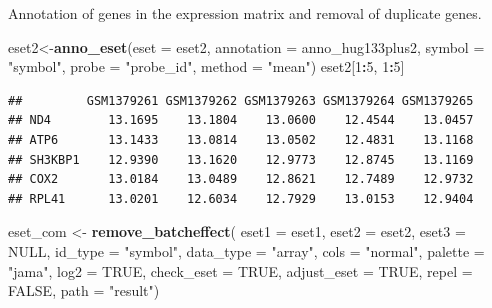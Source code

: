 \documentclass[
  12pt,
]{book}
\newenvironment{Shaded}{\begin{snugshade}}{\end{snugshade}}
\newcommand{\AttributeTok}[1]{\textcolor[rgb]{0.13,0.29,0.53}{#1}}
\newcommand{\ConstantTok}[1]{\textcolor[rgb]{0.56,0.35,0.01}{#1}}
\newcommand{\DecValTok}[1]{\textcolor[rgb]{0.00,0.00,0.81}{#1}}
\newcommand{\FunctionTok}[1]{\textcolor[rgb]{0.13,0.29,0.53}{\textbf{#1}}}
\newcommand{\NormalTok}[1]{#1}
\newcommand{\OtherTok}[1]{\textcolor[rgb]{0.56,0.35,0.01}{#1}}
\newcommand{\SpecialCharTok}[1]{\textcolor[rgb]{0.81,0.36,0.00}{\textbf{#1}}}
\newcommand{\StringTok}[1]{\textcolor[rgb]{0.31,0.60,0.02}{#1}}
\begin{document}
Annotation of genes in the expression matrix and removal of duplicate genes.

\begin{Shaded}
\begin{Highlighting}[]
\NormalTok{eset2}\OtherTok{\textless{}{-}}\FunctionTok{anno\_eset}\NormalTok{(}\AttributeTok{eset       =}\NormalTok{ eset2,}
                 \AttributeTok{annotation =}\NormalTok{ anno\_hug133plus2,}
                 \AttributeTok{symbol     =} \StringTok{"symbol"}\NormalTok{,}
                 \AttributeTok{probe      =} \StringTok{"probe\_id"}\NormalTok{,}
                 \AttributeTok{method     =} \StringTok{"mean"}\NormalTok{)}
\NormalTok{eset2[}\DecValTok{1}\SpecialCharTok{:}\DecValTok{5}\NormalTok{, }\DecValTok{1}\SpecialCharTok{:}\DecValTok{5}\NormalTok{]}
\end{Highlighting}
\end{Shaded}

\begin{verbatim}
##         GSM1379261 GSM1379262 GSM1379263 GSM1379264 GSM1379265
## ND4        13.1695    13.1804    13.0600    12.4544    13.0457
## ATP6       13.1433    13.0814    13.0502    12.4831    13.1168
## SH3KBP1    12.9390    13.1620    12.9773    12.8745    13.1169
## COX2       13.0184    13.0489    12.8621    12.7489    12.9732
## RPL41      13.0201    12.6034    12.7929    13.0153    12.9404
\end{verbatim}

\begin{Shaded}
\begin{Highlighting}[]
\NormalTok{eset\_com }\OtherTok{\textless{}{-}} \FunctionTok{remove\_batcheffect}\NormalTok{( }\AttributeTok{eset1       =}\NormalTok{ eset1,  }
                                \AttributeTok{eset2       =}\NormalTok{ eset2,   }
                                \AttributeTok{eset3       =} \ConstantTok{NULL}\NormalTok{,}
                                \AttributeTok{id\_type     =} \StringTok{"symbol"}\NormalTok{,}
                                \AttributeTok{data\_type   =} \StringTok{"array"}\NormalTok{, }
                                \AttributeTok{cols        =} \StringTok{"normal"}\NormalTok{, }
                                \AttributeTok{palette     =} \StringTok{"jama"}\NormalTok{, }
                                \AttributeTok{log2        =} \ConstantTok{TRUE}\NormalTok{, }
                                \AttributeTok{check\_eset  =} \ConstantTok{TRUE}\NormalTok{,}
                                \AttributeTok{adjust\_eset =} \ConstantTok{TRUE}\NormalTok{,}
                                \AttributeTok{repel       =} \ConstantTok{FALSE}\NormalTok{,}
                                \AttributeTok{path        =} \StringTok{"result"}\NormalTok{)}
\end{Highlighting}
\end{Shaded}
\end{document}

